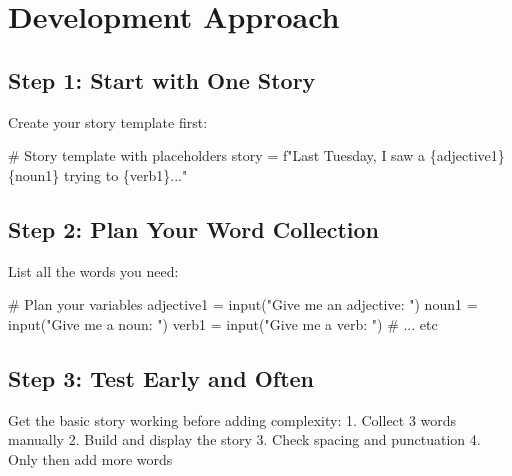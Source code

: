 \documentclass[
  letterpaper,
  DIV=11,
  numbers=noendperiod,
  oneside]{scrreprt}
\newenvironment{Shaded}{}{}
\newcommand{\BuiltInTok}[1]{\textcolor[rgb]{0.84,0.23,0.29}{#1}}
\newcommand{\CommentTok}[1]{\textcolor[rgb]{0.42,0.45,0.49}{#1}}
\newcommand{\NormalTok}[1]{\textcolor[rgb]{0.14,0.16,0.18}{#1}}
\newcommand{\OperatorTok}[1]{\textcolor[rgb]{0.14,0.16,0.18}{#1}}
\newcommand{\SpecialCharTok}[1]{\textcolor[rgb]{0.00,0.36,0.77}{#1}}
\newcommand{\SpecialStringTok}[1]{\textcolor[rgb]{0.01,0.18,0.38}{#1}}
\newcommand{\StringTok}[1]{\textcolor[rgb]{0.01,0.18,0.38}{#1}}
\begin{document}
\section{Development Approach}\label{development-approach-1}

\subsection{Step 1: Start with One
Story}\label{step-1-start-with-one-story}

Create your story template first:

\begin{Shaded}
\begin{Highlighting}[]
\CommentTok{\# Story template with placeholders}
\NormalTok{story }\OperatorTok{=} \SpecialStringTok{f"Last Tuesday, I saw a }\SpecialCharTok{\{}\NormalTok{adjective1}\SpecialCharTok{\}}\SpecialStringTok{ }\SpecialCharTok{\{}\NormalTok{noun1}\SpecialCharTok{\}}\SpecialStringTok{ trying to }\SpecialCharTok{\{}\NormalTok{verb1}\SpecialCharTok{\}}\SpecialStringTok{..."}
\end{Highlighting}
\end{Shaded}

\subsection{Step 2: Plan Your Word
Collection}\label{step-2-plan-your-word-collection}

List all the words you need:

\begin{Shaded}
\begin{Highlighting}[]
\CommentTok{\# Plan your variables}
\NormalTok{adjective1 }\OperatorTok{=} \BuiltInTok{input}\NormalTok{(}\StringTok{"Give me an adjective: "}\NormalTok{)}
\NormalTok{noun1 }\OperatorTok{=} \BuiltInTok{input}\NormalTok{(}\StringTok{"Give me a noun: "}\NormalTok{)}
\NormalTok{verb1 }\OperatorTok{=} \BuiltInTok{input}\NormalTok{(}\StringTok{"Give me a verb: "}\NormalTok{)}
\CommentTok{\# ... etc}
\end{Highlighting}
\end{Shaded}

\subsection{Step 3: Test Early and
Often}\label{step-3-test-early-and-often}

Get the basic story working before adding complexity: 1. Collect 3 words
manually 2. Build and display the story 3. Check spacing and punctuation
4. Only then add more words
\end{document}
